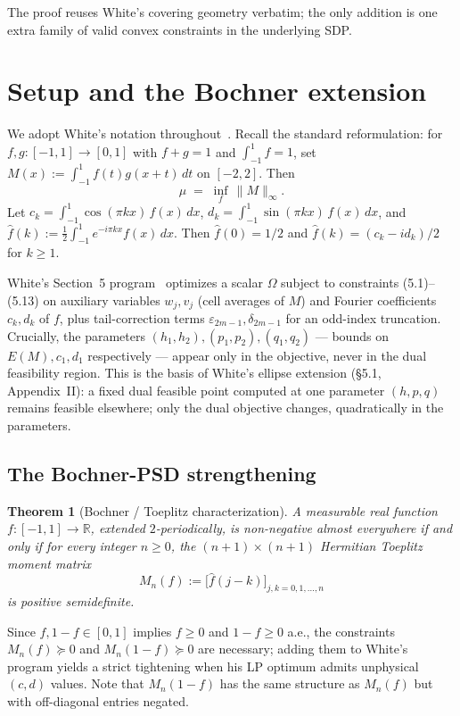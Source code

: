 \documentclass[11pt]{article}
\theoremstyle{plain}
\newtheorem{theorem}{Theorem}
\theoremstyle{definition}
\begin{document}
The proof reuses White's covering geometry verbatim; the only addition
is one extra family of valid convex constraints in the underlying SDP.

\section{Setup and the Bochner extension}

We adopt White's notation throughout~\cite[\S2]{White2023}. Recall the
standard reformulation: for $f, g : [-1, 1] \to [0, 1]$ with $f + g = 1$
and $\int_{-1}^1 f = 1$, set
\(
M(x) := \int_{-1}^1 f(t) g(x + t)\, dt
\)
on $[-2, 2]$. Then
\[
\mu \;=\; \inf_f\, \|M\|_\infty.
\]
Let $c_k = \int_{-1}^1 \cos(\pi k x)\, f(x)\, dx$,
$d_k = \int_{-1}^1 \sin(\pi k x)\, f(x)\, dx$, and
$\hat f(k) := \tfrac12 \int_{-1}^1 e^{-i\pi k x} f(x)\, dx$. Then
$\hat f(0) = 1/2$ and $\hat f(k) = (c_k - i d_k)/2$ for $k \ge 1$.

White's Section~5 program~\cite[\S5]{White2023} optimizes a scalar
$\Omega$ subject to constraints (5.1)--(5.13) on auxiliary variables
$w_j, v_j$ (cell averages of $M$) and Fourier coefficients $c_k, d_k$
of $f$, plus tail-correction terms $\varepsilon_{2m-1}, \delta_{2m-1}$
for an odd-index truncation. Crucially, the parameters
$(h_1, h_2), (p_1, p_2), (q_1, q_2)$ — bounds on
$E(M), c_1, d_1$ respectively — appear only in the objective, never in
the dual feasibility region. This is the basis of White's ellipse
extension (\S5.1, Appendix~II): a fixed dual feasible point computed at
one parameter $(h, p, q)$ remains feasible elsewhere; only the dual
objective changes, quadratically in the parameters.

\subsection{The Bochner-PSD strengthening}

\begin{theorem}[Bochner / Toeplitz characterization]\label{thm:bochner}
A measurable real function $f : [-1, 1] \to \mathbb{R}$, extended
$2$-periodically, is non-negative almost everywhere if and only if for
every integer $n \ge 0$, the $(n+1) \times (n+1)$ Hermitian Toeplitz
moment matrix
\[
M_n(f) := \bigl[\hat f(j - k)\bigr]_{j, k = 0, 1, \dots, n}
\]
is positive semidefinite.
\end{theorem}

Since $f, 1-f \in [0, 1]$ implies $f \ge 0$ and $1 - f \ge 0$ a.e., the
constraints $M_n(f) \succeq 0$ and $M_n(1 - f) \succeq 0$ are
necessary; adding them to White's program yields a strict tightening
when his LP optimum admits unphysical $(c, d)$ values. Note that
$M_n(1 - f)$ has the same structure as $M_n(f)$ but with off-diagonal
entries negated.
\end{document}
